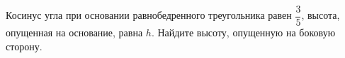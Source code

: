 \begin{ex}
	\begin{condition}
		Косинус угла при основании равнобедренного треугольника равен \( \dfrac{3}{5} \), высота, опущенная на основание, равна \( h \). Найдите высоту, опущенную на боковую сторону.
	\end{condition}
\end{ex}